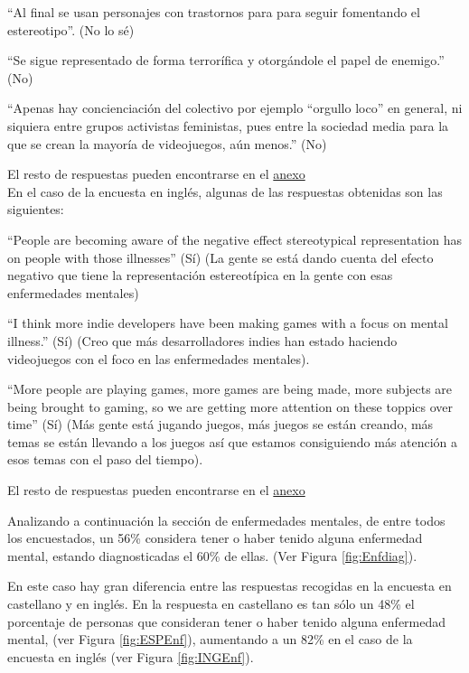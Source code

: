\documentclass[12pt, a4paper,twoside,titlepage]{book}
\begin{document}
``Al final se usan personajes con trastornos para para seguir fomentando el estereotipo''. (No lo sé) 

``Se sigue representado de forma terrorífica y otorgándole el papel de enemigo.'' (No)

``Apenas hay concienciación del colectivo por ejemplo ``orgullo loco'' en general, ni siquiera entre grupos activistas feministas, pues entre la sociedad media para la que se crean la mayoría de videojuegos, aún menos.'' (No) 

El resto de respuestas pueden encontrarse en el   \hyperref[mejorCastellano]{anexo}\\


 
En el caso de la encuesta en inglés, algunas de las respuestas obtenidas son las siguientes: 

``People are becoming aware of the negative effect stereotypical representation has on people with those illnesses'' (Sí) (La gente se está dando cuenta del efecto negativo que tiene la representación estereotípica en la gente con esas enfermedades mentales)

``I think more indie developers have been making games with a focus on mental illness.'' (Sí) (Creo que más desarrolladores indies han estado haciendo videojuegos con el foco en las enfermedades mentales).

``More people are playing games, more games are being made, more subjects are being brought to gaming, so we are getting more attention on these toppics over time'' (Sí) (Más gente está jugando juegos, más juegos se están creando, más temas se están llevando a los juegos así que estamos consiguiendo más atención a esos temas con el paso del tiempo).

El resto de respuestas pueden encontrarse en el \hyperref[mejorIngles]{anexo}



Analizando a continuación la sección de enfermedades mentales, de entre todos los encuestados, un 56\% considera tener o haber tenido alguna enfermedad mental, estando diagnosticadas el 60\% de ellas. (Ver Figura \ref{fig:Enfdiag}). 

En este caso hay gran diferencia entre las respuestas recogidas en la encuesta en castellano y en inglés. En la respuesta en castellano es tan sólo un 48\% el porcentaje de personas que consideran tener o haber tenido alguna enfermedad mental, (ver Figura \ref{fig:ESPEnf}), aumentando a un 82\% en el caso de la encuesta en inglés (ver Figura \ref{fig:INGEnf}). 
\end{document}
